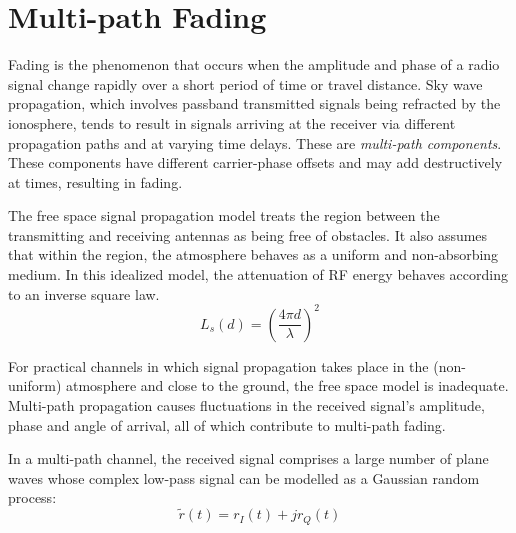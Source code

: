 \section{Multi-path Fading}
Fading is the phenomenon that occurs when the amplitude and phase of a radio signal change rapidly over a short period of time or travel distance\cite{fuqin}.
Sky wave propagation, which involves passband transmitted signals being refracted by the ionosphere, tends to result in signals arriving at the receiver via different propagation paths and at varying time delays. These are \emph{multi-path components}.
These components have different carrier-phase offsets and may add destructively at times, resulting in fading\cite{Proakis}. 

The free space signal propagation model treats the region between the transmitting and receiving antennas as being free of obstacles. It also assumes that within the region, the atmosphere behaves as a uniform and non-absorbing medium. In this idealized model, the attenuation of \gls{RF} energy behaves according to an inverse square law\cite{AWGN}.
\begin{equation}
	L_s(d) = \left( \frac{4\pi d}{\lambda} \right)^2
\end{equation}
\begin{mathDef}
\end{mathDef}
For practical channels in which signal propagation takes place in the (non-uniform) atmosphere and close to the ground, the free space model is inadequate. Multi-path propagation causes fluctuations in the received signal's amplitude, phase and angle of arrival, all of which contribute to multi-path fading\cite{AWGN}.

In a multi-path channel, the received signal comprises a large number of plane waves whose complex low-pass signal can be modelled as a Gaussian random process\cite{fuqin}:
\begin{equation}
	\tilde{r}(t) = r_I(t) + jr_Q(t)
\end{equation}
\begin{mathDef}
\end{mathDef}

